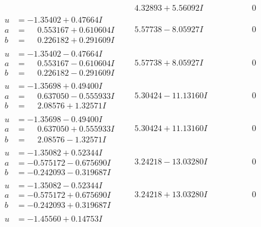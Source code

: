 \documentclass[1p]{elsarticle_modified}
\theoremstyle{definition}
\begin{document}
$$\begin{array}{c|c|c}
 & \phantom{-}4.32893 + 5.56092 I & \phantom{-0.000000 } 0 \\ \hline\begin{aligned}
u &= -1.35402 + 0.47664 I \\
a &= \phantom{-}0.553167 + 0.610604 I \\
b &= \phantom{-}0.226182 + 0.291609 I\end{aligned}
 & \phantom{-}5.57738 - 8.05927 I & \phantom{-0.000000 } 0 \\ \hline\begin{aligned}
u &= -1.35402 - 0.47664 I \\
a &= \phantom{-}0.553167 - 0.610604 I \\
b &= \phantom{-}0.226182 - 0.291609 I\end{aligned}
 & \phantom{-}5.57738 + 8.05927 I & \phantom{-0.000000 } 0 \\ \hline\begin{aligned}
u &= -1.35698 + 0.49400 I \\
a &= \phantom{-}0.637050 - 0.555933 I \\
b &= \phantom{-}2.08576 + 1.32571 I\end{aligned}
 & \phantom{-}5.30424 - 11.13160 I & \phantom{-0.000000 } 0 \\ \hline\begin{aligned}
u &= -1.35698 - 0.49400 I \\
a &= \phantom{-}0.637050 + 0.555933 I \\
b &= \phantom{-}2.08576 - 1.32571 I\end{aligned}
 & \phantom{-}5.30424 + 11.13160 I & \phantom{-0.000000 } 0 \\ \hline\begin{aligned}
u &= -1.35082 + 0.52344 I \\
a &= -0.575172 - 0.675690 I \\
b &= -0.242093 - 0.319687 I\end{aligned}
 & \phantom{-}3.24218 - 13.03280 I & \phantom{-0.000000 } 0 \\ \hline\begin{aligned}
u &= -1.35082 - 0.52344 I \\
a &= -0.575172 + 0.675690 I \\
b &= -0.242093 + 0.319687 I\end{aligned}
 & \phantom{-}3.24218 + 13.03280 I & \phantom{-0.000000 } 0 \\ \hline\begin{aligned}
u &= -1.45560 + 0.14753 I \\

\end{aligned}
\end{array}$$
\end{document}
